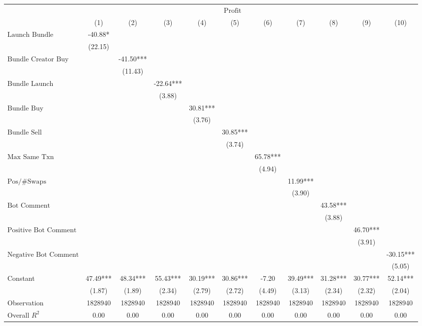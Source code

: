\begin{tabular}{lcccccccccc}
\hline
 & \multicolumn{9}{c}{$\text{Profit}$} \\ & (1) & (2) & (3) & (4) & (5) & (6) & (7) & (8) & (9) & (10)\\
\hline
$\text{Launch Bundle}$& -40.88* &  &  &  &  &  &  &  &  &  \\
& (22.15) &  &  &  &  &  &  &  &  &  \\
$\text{Bundle Creator Buy}$&  & -41.50*** &  &  &  &  &  &  &  &  \\
&  & (11.43) &  &  &  &  &  &  &  &  \\
$\text{Bundle Launch}$&  &  & -22.64*** &  &  &  &  &  &  &  \\
&  &  & (3.88) &  &  &  &  &  &  &  \\
$\text{Bundle Buy}$&  &  &  & 30.81*** &  &  &  &  &  &  \\
&  &  &  & (3.76) &  &  &  &  &  &  \\
$\text{Bundle Sell}$&  &  &  &  & 30.85*** &  &  &  &  &  \\
&  &  &  &  & (3.74) &  &  &  &  &  \\
$\text{Max Same Txn}$&  &  &  &  &  & 65.78*** &  &  &  &  \\
&  &  &  &  &  & (4.94) &  &  &  &  \\
$\text{Pos/\#Swaps}$&  &  &  &  &  &  & 11.99*** &  &  &  \\
&  &  &  &  &  &  & (3.90) &  &  &  \\
$\text{Bot Comment}$&  &  &  &  &  &  &  & 43.58*** &  &  \\
&  &  &  &  &  &  &  & (3.88) &  &  \\
$\text{Positive Bot Comment}$&  &  &  &  &  &  &  &  & 46.70*** &  \\
&  &  &  &  &  &  &  &  & (3.91) &  \\
$\text{Negative Bot Comment}$&  &  &  &  &  &  &  &  &  & -30.15*** \\
&  &  &  &  &  &  &  &  &  & (5.05) \\
Constant& 47.49*** & 48.34*** & 55.43*** & 30.19*** & 30.86*** & -7.20 & 39.49*** & 31.28*** & 30.77*** & 52.14*** \\
& (1.87) & (1.89) & (2.34) & (2.79) & (2.72) & (4.49) & (3.13) & (2.34) & (2.32) & (2.04) \\
Observation& 1828940 & 1828940 & 1828940 & 1828940 & 1828940 & 1828940 & 1828940 & 1828940 & 1828940 & 1828940 \\
Overall $R^2$& 0.00 & 0.00 & 0.00 & 0.00 & 0.00 & 0.00 & 0.00 & 0.00 & 0.00 & 0.00 \\
\hline
\end{tabular}
